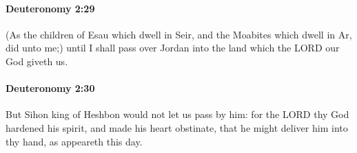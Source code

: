 		\paragraph{Deuteronomy 2:29} %
			\label{DEUTERONOMY-2-29}

			(As the children of Esau which dwell in Seir, and the Moabites which dwell in Ar, did unto me;) until I shall pass over Jordan into the land which the LORD our God giveth us.


		\paragraph{Deuteronomy 2:30} %
			\label{DEUTERONOMY-2-30}

			But Sihon king of Heshbon would not let us pass by him: for the LORD thy God hardened his spirit, and made his heart obstinate, that he might deliver him into thy hand, as appeareth this day.

